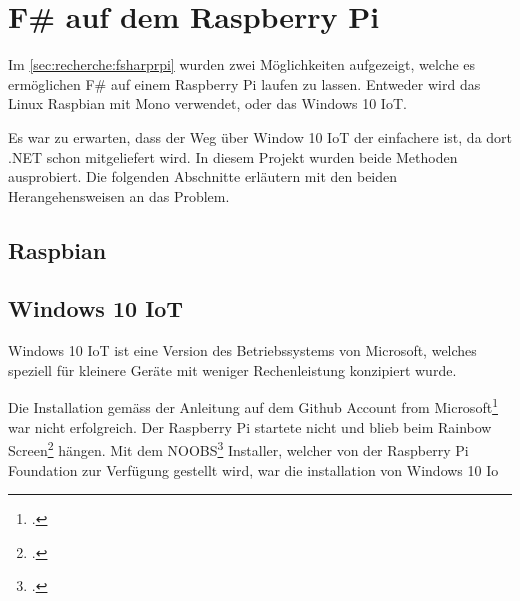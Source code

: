 \section{F\# auf dem Raspberry Pi}
Im \cref{sec:recherche:fsharprpi}  wurden zwei Möglichkeiten aufgezeigt, welche es ermöglichen F\# auf einem Raspberry Pi laufen zu lassen.
Entweder wird das Linux Raspbian mit Mono verwendet, oder das Windows 10 IoT.

Es war zu erwarten, dass der Weg über Window 10 IoT der einfachere ist, da dort .NET schon mitgeliefert wird. 
In diesem Projekt wurden beide Methoden ausprobiert. 
Die folgenden Abschnitte erläutern mit den beiden Herangehensweisen an das Problem.

\subsection{Raspbian}

\subsection{Windows 10 IoT}
Windows 10 IoT ist eine Version des Betriebssystems von Microsoft, welches speziell für kleinere Geräte mit weniger Rechenleistung konzipiert wurde.

Die Installation gemäss der Anleitung auf dem Github Account from Microsoft\footcite{install_win10iot_2016-04-25} war nicht erfolgreich. 
Der Raspberry Pi startete nicht und blieb beim Rainbow Screen\footcite{RPi_Rainbowscreen_2016-04-25} hängen. 
Mit dem NOOBS\footcite{NOOBS_2016-04-25} Installer, welcher von der Raspberry Pi Foundation zur Verfügung gestellt wird, war die installation von Windows 10 Io